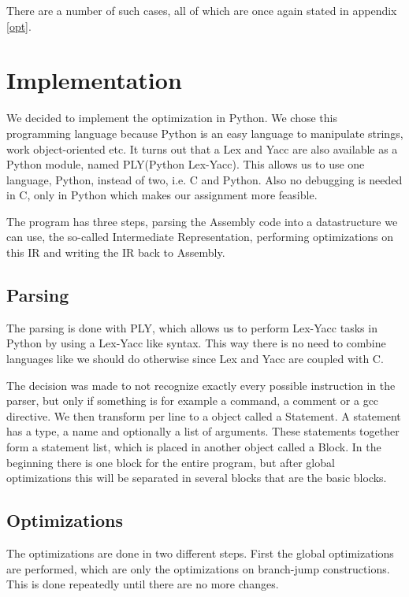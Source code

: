 \documentclass[10pt,a4paper]{article}
\begin{document}
There are a number of such cases, all of which are once again stated in
appendix \ref{opt}. 

\section{Implementation}

We decided to implement the optimization in Python. We chose this programming
language because Python is an easy language to manipulate strings, work
object-oriented etc.
It turns out that a Lex and Yacc are also available as a Python module,
named PLY(Python Lex-Yacc). This allows us to use one language, Python, instead
of two, i.e. C and Python. Also no debugging is needed in C, only in Python
which makes our assignment more feasible.

The program has three steps, parsing the Assembly code into a datastructure we
can use, the so-called Intermediate Representation, performing optimizations on
this IR and writing the IR back to Assembly.

\subsection{Parsing}

The parsing is done with PLY, which allows us to perform Lex-Yacc tasks in
Python by using a Lex-Yacc like syntax. This way there is no need to combine
languages like we should do otherwise since Lex and Yacc are coupled with C.

The decision was made to not recognize exactly every possible instruction in
the parser, but only if something is for example a command, a comment or a gcc
directive. We then transform per line to a object called a Statement. A
statement has a type, a name and optionally a list of arguments. These
statements together form a statement list, which is placed in another object
called a Block. In the beginning there is one block for the entire program, but
after global optimizations this will be separated in several blocks that are
the basic blocks.

\subsection{Optimizations}

The optimizations are done in two different steps. First the global
optimizations are performed, which are only the optimizations on branch-jump
constructions. This is done repeatedly until there are no more changes.
\end{document}
